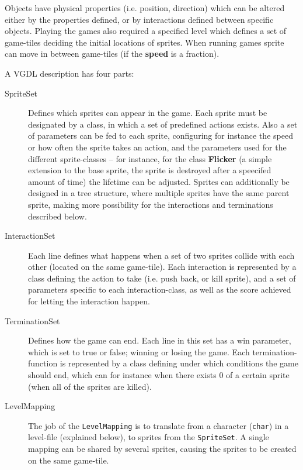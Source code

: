 \documentclass[a4paper,titlepage,final]{report}
\begin{document}
Objects have physical properties (i.e. position, direction) which can be altered either by the properties defined, or by interactions defined between specific objects. 
Playing the games also required a specified level which defines a set of game-tiles deciding the initial locations of sprites. When running games sprite can move in between game-tiles (if the \textbf{speed} is a fraction).

A VGDL description has four parts: 

\begin{description}
\item [SpriteSet] Defines which sprites can appear in the game. Each sprite must be designated by a class, in which a set of predefined actions exists. Also a set of parameters can be fed to each sprite, configuring for instance the speed or how often the sprite takes an action, and the parameters used for the different sprite-classes -- for instance, for the  class \textbf{Flicker} (a simple extension to the base sprite, the sprite is destroyed after a speecifed amount of time) the lifetime can be adjusted.
Sprites can additionally be designed in a tree structure, where multiple sprites have the same parent sprite, making more possibility for the interactions and terminations described below. 
\item [InteractionSet] Each line defines what happens when a set of two sprites collide with each other (located on the same game-tile). Each interaction is represented by a class defining the action to take (i.e. push back, or kill sprite), and a set of parameters specific to each interaction-class, as well as the score achieved for letting the interaction happen.
\item [TerminationSet] Defines how the game can end. Each line in this set has a win parameter, which is set to true or false; winning or losing the game.
Each termination-function is represented by a class defining under which conditions the game should end, which can for instance when there exists 0 of a certain sprite (when all of the sprites are killed).
\item [LevelMapping] The job of the \texttt{LevelMapping} is to translate from a character (\texttt{char}) in a level-file (explained below), to sprites from the \texttt{SpriteSet}. 
A single mapping can be shared by several sprites, causing the sprites to be created on the same game-tile.
\end{description}
\end{document}
